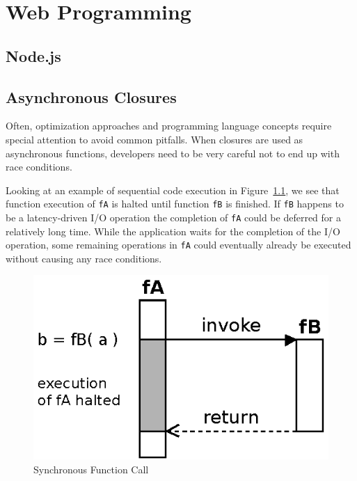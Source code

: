 \chapter{Web Programming}


\section{Node.js}


\section{Asynchronous Closures}
%


Often, optimization approaches and programming language concepts require special attention to avoid common pitfalls.
When closures are used as asynchronous functions, developers need to be very careful not to end up with race conditions.


Looking at an example of sequential code execution in Figure~\ref{fig:Closures_Synchronous}, we see that function execution of \texttt{fA} is halted until function \texttt{fB} is finished.
If \texttt{fB} happens to be a latency-driven I/O operation the completion of \texttt{fA} could be deferred for a relatively long time.
While the application waits for the completion of the I/O operation, some remaining operations in \texttt{fA} could eventually already be executed without causing any race conditions.
\begin{figure}[!ht]
	\centering
  \includegraphics{figures/Closures_Synchronous}
	\caption{Synchronous Function Call}
	\label{fig:Closures_Synchronous}
\end{figure}


